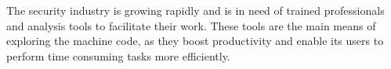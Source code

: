 The security industry is growing rapidly and is in need of trained
professionals and analysis tools to facilitate their work. These tools
are the main means of exploring the machine code, as they boost productivity
and enable its users to perform time consuming tasks more efficiently.
